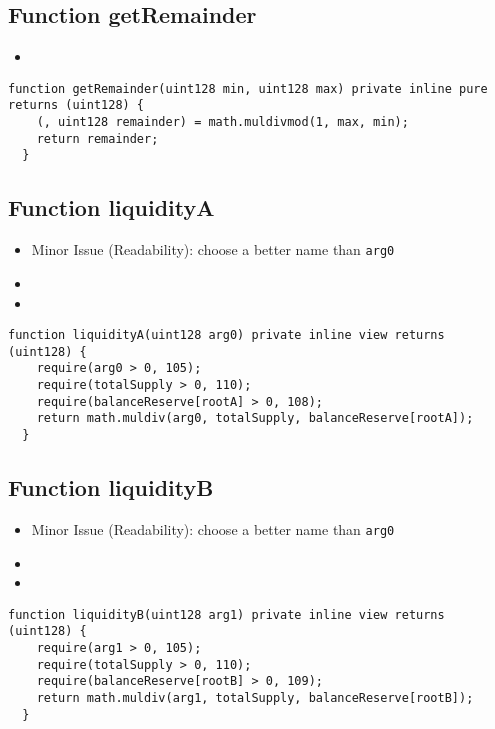 \subsection{Function getRemainder}

\begin{itemize}
\item \issueInternal
\end{itemize}

\begin{lstlisting}[firstnumber=171]
  function getRemainder(uint128 min, uint128 max) private inline pure returns (uint128) {
    (, uint128 remainder) = math.muldivmod(1, max, min);
    return remainder;
  }
\end{lstlisting}

\subsection{Function liquidityA}

\begin{itemize}
\item Minor Issue (Readability): choose a better name than {\tt arg0}
\item \issueError{}
\item \issueInternal
\end{itemize}

\begin{lstlisting}[firstnumber=191]
  function liquidityA(uint128 arg0) private inline view returns (uint128) {
    require(arg0 > 0, 105);
    require(totalSupply > 0, 110);
    require(balanceReserve[rootA] > 0, 108);
    return math.muldiv(arg0, totalSupply, balanceReserve[rootA]);
  }
\end{lstlisting}

\subsection{Function liquidityB}

\begin{itemize}
\item Minor Issue (Readability): choose a better name than {\tt arg0}
\item \issueError{}
\item \issueInternal
\end{itemize}

\begin{lstlisting}[firstnumber=199]
  function liquidityB(uint128 arg1) private inline view returns (uint128) {
    require(arg1 > 0, 105);
    require(totalSupply > 0, 110);
    require(balanceReserve[rootB] > 0, 109);
    return math.muldiv(arg1, totalSupply, balanceReserve[rootB]);
  }
\end{lstlisting}

